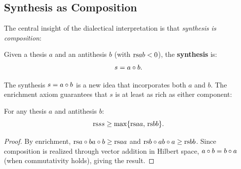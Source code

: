 \subsection{Synthesis as Composition}

The central insight of the dialectical interpretation is that \emph{synthesis is
composition}:

\begin{definition}
\label{def:synthesis}
Given a thesis $a$ and an antithesis $b$ (with $\mathrm{rs}{a}{b} < 0$), the
\textbf{synthesis} is:
\[
  s = a \circ b.
\]
\end{definition}

The synthesis $s = a \circ b$ is a new idea that incorporates both $a$ and
$b$.  The enrichment axiom guarantees that $s$ is at least as rich as either
component:

\begin{proposition}
\label{prop:synthesis-enriches}
For any thesis $a$ and antithesis $b$:
\[
  \mathrm{rs}{s}{s} \geq \max\{\mathrm{rs}{a}{a},\, \mathrm{rs}{b}{b}\}.
\]
\end{proposition}

\begin{proof}
By enrichment, $\mathrm{rs}{a \circ b}{a \circ b} \geq \mathrm{rs}{a}{a}$ and
$\mathrm{rs}{b \circ a}{b \circ a} \geq \mathrm{rs}{b}{b}$.  Since composition is
realized through vector addition in Hilbert space, $a \circ b = b \circ a$
(when commutativity holds), giving the result.
\end{proof}


